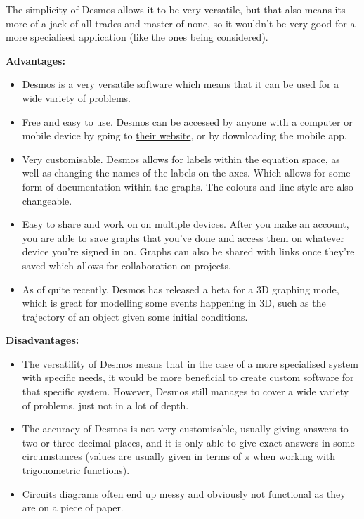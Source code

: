 \documentclass[11pt]{article}
\begin{document}
                The simplicity of Desmos allows it to be very versatile, but that also means its more of a jack-of-all-trades and master of none, so it wouldn't be very good for a more specialised application (like the ones being considered).


                \textbf{Advantages:}
                \begin{itemize}
                    \item Desmos is a very versatile software which means that it can be used for a wide variety of problems. 
                    \item Free and easy to use. Desmos can be accessed by anyone with a computer or mobile device by going to \href{https://www.desmos.com/calculator}{their website}, or by downloading the mobile app.
                    \item Very customisable. Desmos allows for labels within the equation space, as well as changing the names of the labels on the axes. Which allows for some form of documentation within the graphs. The colours and line style are also changeable.
                    \item Easy to share and work on on multiple devices. After you make an account, you are able to save graphs that you've done and access them on whatever device you're signed in on. Graphs can also be shared with links once they're saved which allows for collaboration on projects.
                    \item As of quite recently, Desmos has released a beta for a 3D graphing mode, which is great for modelling some events happening in 3D, such as the trajectory of an object given some initial conditions.
                \end{itemize}


                \textbf{Disadvantages:}
                \begin{itemize}
                    \item The versatility of Desmos means that in the case of a more specialised system with specific needs, it would be more beneficial to create custom software for that specific system. However, Desmos still manages to cover a wide variety of problems, just not in a lot of depth.
                    \item The accuracy of Desmos is not very customisable, usually giving answers to two or three decimal places, and it is only able to give exact answers in some circumstances (values are usually given in terms of $\pi$ when working with trigonometric functions).
                    \item Circuits diagrams often end up messy and obviously not functional as they are on a piece of paper.
                \end{itemize}
\end{document}
